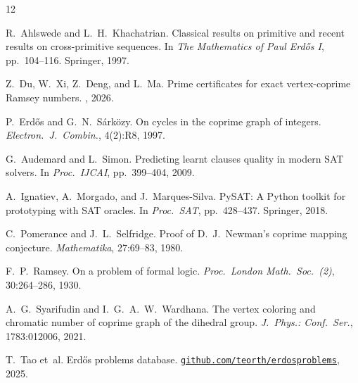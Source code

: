 \documentclass[12pt]{article}
\begin{document}
\begin{thebibliography}{12}

R.~Ahlswede and L.~H.~Khachatrian.
Classical results on primitive and recent results on cross-primitive
sequences.
In \emph{The Mathematics of Paul Erd\H{o}s I}, pp.~104--116.
Springer, 1997.

Z.~Du, W.~Xi, Z.~Deng, and L.~Ma.
Prime certificates for exact vertex-coprime Ramsey numbers.
, 2026.

P.~Erd\H{o}s and G.~N.~S\'ark\"ozy.
On cycles in the coprime graph of integers.
\emph{Electron.\ J.\ Combin.}, 4(2):R8, 1997.

G.~Audemard and L.~Simon.
Predicting learnt clauses quality in modern {SAT} solvers.
In \emph{Proc.\ IJCAI}, pp.~399--404, 2009.

A.~Ignatiev, A.~Morgado, and J.~Marques-Silva.
{PySAT}: A {P}ython toolkit for prototyping with {SAT} oracles.
In \emph{Proc.\ SAT}, pp.~428--437. Springer, 2018.

C.~Pomerance and J.~L.~Selfridge.
Proof of {D.~J.~Newman's} coprime mapping conjecture.
\emph{Mathematika}, 27:69--83, 1980.

F.~P.~Ramsey.
On a problem of formal logic.
\emph{Proc.\ London Math.\ Soc.\ (2)}, 30:264--286, 1930.

A.~G.~Syarifudin and I.~G.~A.~W.~Wardhana.
The vertex coloring and chromatic number of coprime graph of the
dihedral group.
\emph{J.\ Phys.: Conf.\ Ser.}, 1783:012006, 2021.

T.~Tao et~al.
Erd\H{o}s problems database.
\href{https://github.com/teorth/erdosproblems}%
{\nolinkurl{github.com/teorth/erdosproblems}}, 2025.

\end{thebibliography}
\end{document}
